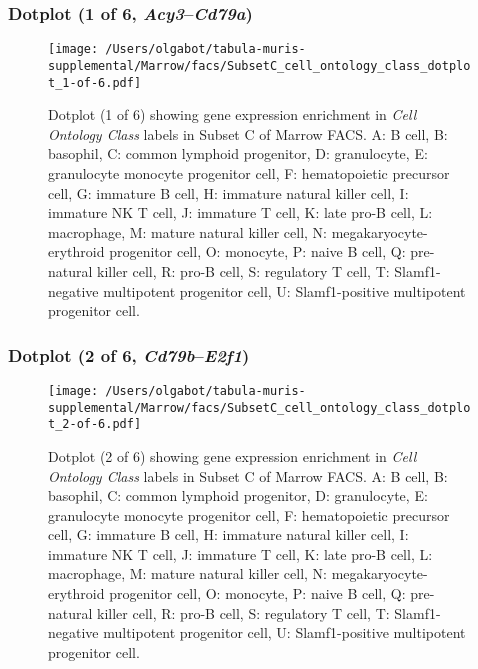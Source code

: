 \subsubsection{Dotplot (1 of 6, \emph{Acy3}--\emph{Cd79a})}
\begin{figure}[h]
\centering
\texttt{[image: /Users/olgabot/tabula-muris-supplemental/Marrow/facs/SubsetC\_cell\_ontology\_class\_dotplot\_1-of-6.pdf]}

\caption{ Dotplot (1 of 6)  showing gene expression enrichment in \emph{Cell Ontology Class} labels in Subset C of Marrow FACS. A: B cell, B: basophil, C: common lymphoid progenitor, D: granulocyte, E: granulocyte monocyte progenitor cell, F: hematopoietic precursor cell, G: immature B cell, H: immature natural killer cell, I: immature NK T cell, J: immature T cell, K: late pro-B cell, L: macrophage, M: mature natural killer cell, N: megakaryocyte-erythroid progenitor cell, O: monocyte, P: naive B cell, Q: pre-natural killer cell, R: pro-B cell, S: regulatory T cell, T: Slamf1-negative multipotent progenitor cell, U: Slamf1-positive multipotent progenitor cell.}
\end{figure}


\clearpage

\subsubsection{Dotplot (2 of 6, \emph{Cd79b}--\emph{E2f1})}
\begin{figure}[h]
\centering
\texttt{[image: /Users/olgabot/tabula-muris-supplemental/Marrow/facs/SubsetC\_cell\_ontology\_class\_dotplot\_2-of-6.pdf]}

\caption{ Dotplot (2 of 6)  showing gene expression enrichment in \emph{Cell Ontology Class} labels in Subset C of Marrow FACS. A: B cell, B: basophil, C: common lymphoid progenitor, D: granulocyte, E: granulocyte monocyte progenitor cell, F: hematopoietic precursor cell, G: immature B cell, H: immature natural killer cell, I: immature NK T cell, J: immature T cell, K: late pro-B cell, L: macrophage, M: mature natural killer cell, N: megakaryocyte-erythroid progenitor cell, O: monocyte, P: naive B cell, Q: pre-natural killer cell, R: pro-B cell, S: regulatory T cell, T: Slamf1-negative multipotent progenitor cell, U: Slamf1-positive multipotent progenitor cell.}
\end{figure}


\clearpage

